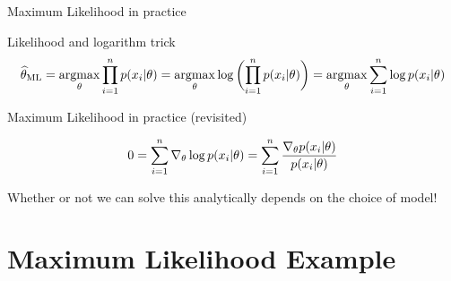 \documentclass[10pt]{beamer}
\begin{document}
\begin{frame}{Maximum Likelihood in practice}


\begin{sblock}{Likelihood and logarithm trick}
\[  \widehat{\theta}_{\text{ML}} = \operatorname*{argmax}_\theta \displaystyle\prod_{i=1}^n p(x_i | \theta) = \operatorname*{argmax}_\theta \log \bigg( { \displaystyle\prod_{i=1}^n p(x_i | \theta)} \bigg) = \operatorname*{argmax}_\theta \displaystyle\sum_{i=1}^n \log p(x_i | \theta)  \]
\end{sblock}

\begin{sblock}{Maximum Likelihood in practice (revisited)}

\[ 0 = \displaystyle\sum_{i=1}^n \nabla_\theta \log p(x_i | \theta) = \displaystyle\sum_{i=1}^n \displaystyle\frac{\nabla_\theta p(x_i |\theta) }{p(x_i |\theta)} \]

Whether or not we can solve this analytically depends on the choice of model!
\end{sblock}

\end{frame}


\section{Maximum Likelihood Example}
\end{document}
